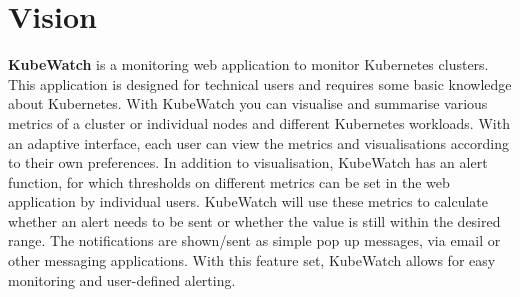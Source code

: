 \chapter{Vision}

\textbf{KubeWatch} is a monitoring web application to monitor Kubernetes clusters. This application is designed for technical users and requires some basic knowledge about Kubernetes. With KubeWatch you can visualise and summarise various metrics of a cluster or individual nodes and different Kubernetes workloads. With an adaptive interface, each user can view the metrics and visualisations according to their own preferences. In addition to visualisation, KubeWatch has an alert function, for which thresholds on different metrics can be set in the web application by individual users. KubeWatch will use these metrics to calculate whether an alert needs to be sent or whether the value is still within the desired range. The notifications are shown/sent as simple pop up messages, via email or other messaging applications. With this feature set, KubeWatch allows for easy monitoring and user-defined alerting.